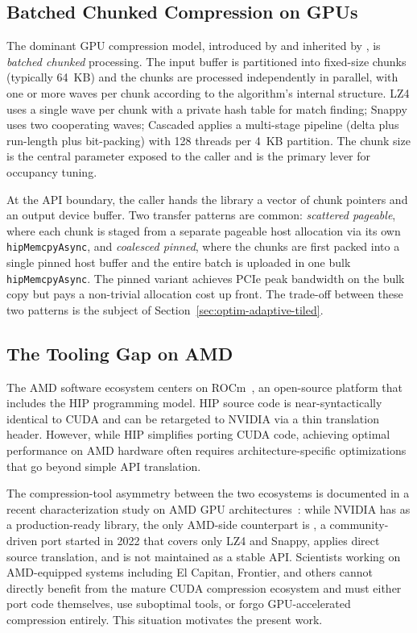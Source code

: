 \subsection{Batched Chunked Compression on GPUs}
\label{sec:bg-batched}

The dominant GPU compression model, introduced by \nvcomp{} and
inherited by \arcto, is \emph{batched chunked} processing. The
input buffer is partitioned into fixed-size chunks (typically
64~KB) and the chunks are processed independently in parallel,
with one or more waves per chunk according to the algorithm's
internal structure. LZ4 uses a single wave per chunk with a
private hash table for match finding; Snappy uses two
cooperating waves; Cascaded applies a multi-stage pipeline
(delta plus run-length plus bit-packing) with 128 threads per
4~KB partition. The chunk size is the central parameter exposed
to the caller and is the primary lever for occupancy tuning.

At the API boundary, the caller hands the library a vector of
chunk pointers and an output device buffer. Two transfer
patterns are common: \emph{scattered pageable}, where each chunk
is staged from a separate pageable host allocation via its own
\texttt{hipMemcpyAsync}, and \emph{coalesced pinned}, where the
chunks are first packed into a single pinned host buffer and the
entire batch is uploaded in one bulk \texttt{hipMemcpyAsync}. The
pinned variant achieves PCIe peak bandwidth on the bulk copy but
pays a non-trivial allocation cost up front. The trade-off
between these two patterns is the subject of
Section~\ref{sec:optim-adaptive-tiled}.

\subsection{The Tooling Gap on AMD}
\label{sec:bg-gap}

The AMD software ecosystem centers on ROCm~\cite{rocm}, an
open-source platform that includes the HIP programming model. HIP source code is near-syntactically identical
to CUDA and can be retargeted to NVIDIA via a thin translation
header. However, while HIP simplifies porting CUDA code,
achieving optimal performance on AMD hardware often requires
architecture-specific optimizations that go beyond simple API
translation.

The compression-tool asymmetry between the two ecosystems is
documented in a recent characterization study on AMD GPU
architectures~\cite{anon_iccsa2026}: while NVIDIA has \nvcomp{}
as a production-ready library, the only AMD-side counterpart is
\hipcomp{}, a community-driven port started in 2022 that covers
only LZ4 and Snappy, applies direct source translation, and is
not maintained as a stable API. Scientists working on
AMD-equipped systems including El Capitan, Frontier, and others
cannot directly benefit from the mature CUDA compression
ecosystem and must either port code themselves, use suboptimal
tools, or forgo GPU-accelerated compression entirely. This
situation motivates the present work.

